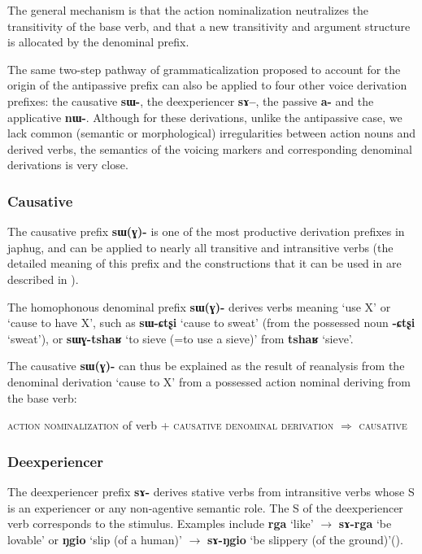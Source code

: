 \documentclass[oldfontcommands,oneside,a4paper,11pt]{article}
\newcommand{\ipa}[1]{\mbox{\phon\textbf{#1}}} %
\begin{document}
The general mechanism is that the action nominalization neutralizes the transitivity of the base verb, and that a new transitivity and argument structure is allocated by the denominal prefix.

 The same two-step pathway of grammaticalization proposed to account for the origin of the antipassive prefix can also be applied to four other voice derivation prefixes: the causative \ipa{sɯ-}, the deexperiencer \ipa{sɤ--}, the passive \ipa{a-} and the applicative \ipa{nɯ-}. Although for these derivations, unlike the antipassive case, we lack common (semantic or morphological) irregularities between action nouns and derived verbs, the semantics of the voicing markers and corresponding denominal derivations is very close.

\subsubsection{Causative}  \label{sec:causative}
The causative prefix \ipa{sɯ(ɣ)-} is one of the most productive derivation prefixes in japhug, and can be applied to nearly all transitive and intransitive verbs (the detailed meaning of this prefix and the constructions that it can be used in are described in \citealt{jacques15causative}). 

 The homophonous denominal prefix \ipa{sɯ(ɣ)-} derives verbs meaning `use X' or `cause to have X', such as \ipa{sɯ-ɕtʂi} `cause to sweat' (from the possessed noun \ipa{-ɕtʂi} `sweat'), or \ipa{sɯɣ-tshaʁ} `to sieve (=to use a sieve)' from \ipa{tshaʁ} `sieve'. 

The causative \ipa{sɯ(ɣ)-} can thus be explained as the result of reanalysis from the denominal derivation `cause to X' from a possessed action nominal deriving from the base verb:

\begin{exe}
\ex \label{ex:pathway2}
\glt \textsc{action nominalization} of verb + \textsc{causative denominal derivation} $\Rightarrow$ \textsc{causative}
\end{exe} 

 


\subsubsection{Deexperiencer} \label{sec:deexp}
 
 The deexperiencer prefix \ipa{sɤ-} derives stative verbs from intransitive verbs whose S is an experiencer or any non-agentive semantic role. The S of the deexperiencer verb corresponds to the stimulus. Examples include \ipa{rga} `like' $\rightarrow$ \ipa{sɤ-rga} `be lovable' or \ipa{ŋgio} `slip (of a human)' $\rightarrow$ \ipa{sɤ-ŋgio} `be slippery (of the ground)'(\citealt{jacques12demotion}).
\end{document}
